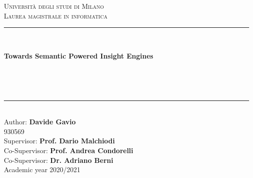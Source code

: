 \documentclass[\main/main.tex]{subfiles}
\begin{document}
\pagestyle{empty} %
\begin{titlepage}
	\begin{center}
		\vfill
		{\large \scshape Università degli studi di Milano}\\[0.1cm]
		{\large \scshape Laurea magistrale in informatica}\\[0.5cm]
		\rule{\textwidth}{1.5pt}\\[0cm]
		{\huge \bfseries  Towards Semantic Powered Insight Engines \par \ }\\[-0.5cm]
		\rule{\textwidth}{1.5pt}\\[2.5cm]
		{\hfill \large Author: \textbf{Davide Gavio}} \\
		\vspace{0.1cm}
		{\hfill \large 930569} \\
		\vspace{0.5cm}
		{\hfill \large Supervisor: \textbf{Prof. Dario Malchiodi}} \\
	    {\hfill \large Co-Supervisor: \textbf{Prof. Andrea Condorelli} \\}
	    {\hfill \large Co-Supervisor: \textbf{Dr. Adriano Berni} \\}
	    \vspace{1cm}
		\hfill  Academic year 2020/2021
	\end{center}
\end{titlepage}
\end{document}
